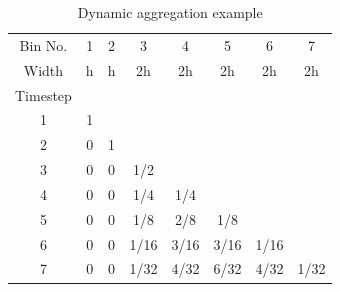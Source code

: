 \documentclass[review,12pt]{elsarticle}
\begin{document}
\begin{table}[htbp!]
\centering
\caption{Dynamic aggregation example}
\label{tab:dynamic example}
\begin{tabular}{cccccccc}
Bin No.                 & 1                      & 2                      & 3                         & 4                         & 5                         & 6                         & 7                         \\
Width                   & h                      & h                      & 2h                        & 2h                        & 2h                        & 2h                        & 2h                        \\
Timestep                &                        &                        &                           &                           &                           &                           &                           \\ \cline{1-2}
\multicolumn{1}{|c|}{1} & \multicolumn{1}{c|}{1} &                        &                           &                           &                           &                           &                           \\ \cline{1-3}
\multicolumn{1}{|c|}{2} & \multicolumn{1}{c|}{0} & \multicolumn{1}{c|}{1} &                           &                           &                           &                           &                           \\ \cline{1-4}
\multicolumn{1}{|c|}{3} & \multicolumn{1}{c|}{0} & \multicolumn{1}{c|}{0} & \multicolumn{1}{c|}{1/2}  &                           &                           &                           &                           \\ \cline{1-5}
\multicolumn{1}{|c|}{4} & \multicolumn{1}{c|}{0} & \multicolumn{1}{c|}{0} & \multicolumn{1}{c|}{1/4}  & \multicolumn{1}{c|}{1/4}  &                           &                           &                           \\ \cline{1-6}
\multicolumn{1}{|c|}{5} & \multicolumn{1}{c|}{0} & \multicolumn{1}{c|}{0} & \multicolumn{1}{c|}{1/8}  & \multicolumn{1}{c|}{2/8}  & \multicolumn{1}{c|}{1/8}  &                           &                           \\ \cline{1-7}
\multicolumn{1}{|c|}{6} & \multicolumn{1}{c|}{0} & \multicolumn{1}{c|}{0} & \multicolumn{1}{c|}{1/16} & \multicolumn{1}{c|}{3/16} & \multicolumn{1}{c|}{3/16} & \multicolumn{1}{c|}{1/16} &                           \\ \hline
\multicolumn{1}{|c|}{7} & \multicolumn{1}{c|}{0} & \multicolumn{1}{c|}{0} & \multicolumn{1}{c|}{1/32} & \multicolumn{1}{c|}{4/32} & \multicolumn{1}{c|}{6/32} & \multicolumn{1}{c|}{4/32} & \multicolumn{1}{c|}{1/32} \\ \hline
\end{tabular}
\end{table}
\end{document}
